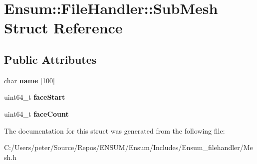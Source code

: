 \hypertarget{struct_ensum_1_1_file_handler_1_1_sub_mesh}{}\section{Ensum\+:\+:File\+Handler\+:\+:Sub\+Mesh Struct Reference}
\label{struct_ensum_1_1_file_handler_1_1_sub_mesh}
\subsection*{Public Attributes}
\begin{DoxyCompactItemize}
\item 
char {\bfseries name} \mbox{[}100\mbox{]}\hypertarget{struct_ensum_1_1_file_handler_1_1_sub_mesh_abc000d2bb4ab4e284a3f3e3622e10293}{}\label{struct_ensum_1_1_file_handler_1_1_sub_mesh_abc000d2bb4ab4e284a3f3e3622e10293}

\item 
uint64\+\_\+t {\bfseries face\+Start}\hypertarget{struct_ensum_1_1_file_handler_1_1_sub_mesh_a43071b4ae61d7dbae72387a4c310e35d}{}\label{struct_ensum_1_1_file_handler_1_1_sub_mesh_a43071b4ae61d7dbae72387a4c310e35d}

\item 
uint64\+\_\+t {\bfseries face\+Count}\hypertarget{struct_ensum_1_1_file_handler_1_1_sub_mesh_a5e291ad042dfd49d3c4d7ea478b5065c}{}\label{struct_ensum_1_1_file_handler_1_1_sub_mesh_a5e291ad042dfd49d3c4d7ea478b5065c}

\end{DoxyCompactItemize}


The documentation for this struct was generated from the following file\+:\begin{DoxyCompactItemize}
\item 
C\+:/\+Users/peter/\+Source/\+Repos/\+E\+N\+S\+U\+M/\+Ensum/\+Includes/\+Ensum\+\_\+filehandler/Mesh.\+h\end{DoxyCompactItemize}
